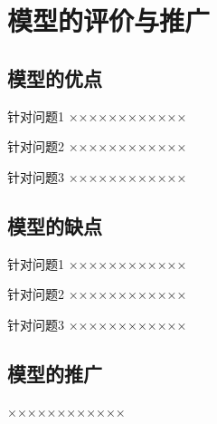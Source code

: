 \section{模型的评价与推广}
\subsection{模型的优点}
针对问题1 ××××××××××××

针对问题2 ××××××××××××

针对问题3 ××××××××××××

\subsection{模型的缺点}
针对问题1 ××××××××××××

针对问题2 ××××××××××××

针对问题3 ××××××××××××

\subsection{模型的推广}
××××××××××××